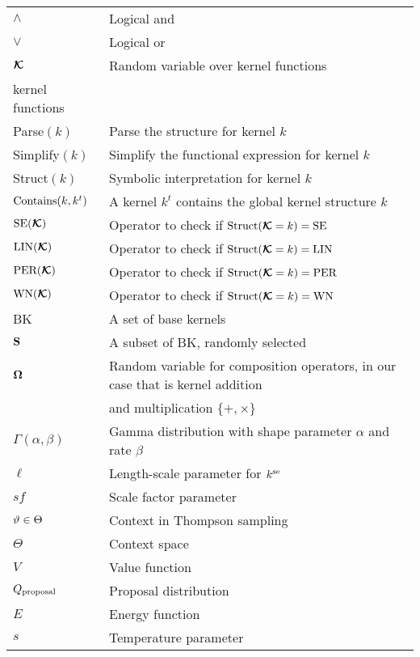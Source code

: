 \begin{tabular}{l l}
$\land$                &  Logical and \\
$\lor$                 &  Logical or \\
$\bm{\mathcal{K}}$			& Random variable over kernel functions \\
kernel functions \\
Parse$(k)$		& Parse the structure for kernel $k$ \\
Simplify$(k)$		& Simplify the functional expression for kernel $k$ \\
Struct$(k)$		& Symbolic interpretation for kernel $k$ \\
$\text{Contains}(k,k^t)$          & A kernel $k^t$ contains the global kernel structure
$k$\\
$\text{SE}(\bm{\mathcal{K}})$			&  Operator to check if $\text{Struct}(\bm{\mathcal{K}}=k)=\text{SE}$\\
$\text{LIN}(\bm{\mathcal{K}})$			&  Operator to check if $\text{Struct}(\bm{\mathcal{K}}=k)=\text{LIN}$\\
$\text{PER}(\bm{\mathcal{K}})$			&  Operator to check if $\text{Struct}(\bm{\mathcal{K}}=k)=\text{PER}$\\
$\text{WN}(\bm{\mathcal{K}})$			&  Operator to check if $\text{Struct}(\bm{\mathcal{K}}=k)=\text{WN}$\\
BK			& A set of base kernels \\
$\mathbf{S}$			& A subset of BK, randomly selected \\
$\bm{\Omega}$		& Random variable for composition operators, in our
case that is kernel addition\\
&and multiplication $\{+,\times\}$\\
$\Gamma(\alpha,\beta)$ & Gamma distribution with shape parameter $\alpha$ and
rate $\beta$ \\

$\ell$			& Length-scale parameter for $k^\text{se}$  \\
$sf$			& Scale factor parameter\\
$\vartheta \in \Theta$    & Context in Thompson sampling\\ 
$\Theta$    & Context space\\ 
$V$			& Value function\\
$Q_{\textrm{proposal}}$		& Proposal distribution\\
$E$			& Energy function\\
$s$			& Temperature parameter \\
\end{tabular}
